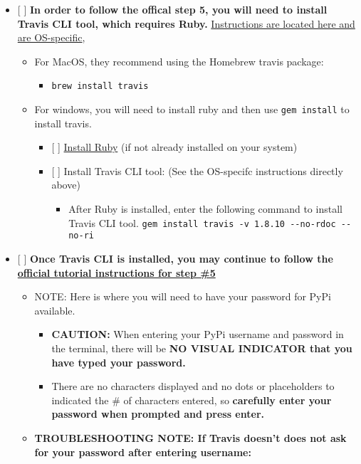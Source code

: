 \documentclass[11pt]{article}
\providecommand{\tightlist}{%
      \setlength{\itemsep}{0pt}\setlength{\parskip}{0pt}}
\begin{document}
\begin{itemize}
\tightlist
\item
  {[} {]} \textbf{In order to follow the offical step 5, you will need
  to install Travis CLI tool, which requires Ruby.}
  \href{https://cookiecutter-pypackage.readthedocs.io/en/latest/travis_pypi_setup.html\#travis-pypi-setup}{Instructions
  are located here and are OS-specific},

  \begin{itemize}
  \tightlist
  \item
    For MacOS, they recommend using the Homebrew travis package:

    \begin{itemize}
    \tightlist
    \item
      \texttt{brew\ install\ travis}
    \end{itemize}
  \item
    For windows, you will need to install ruby and then use
    \texttt{gem\ install} to install travis.

    \begin{itemize}
    \tightlist
    \item
      {[} {]} \href{http://www.ruby-lang.org/en/downloads/}{Install
      Ruby} (if not already installed on your system)
    \item
      {[} {]} Install Travis CLI tool: (See the OS-specifc instructions
      directly above)

      \begin{itemize}
      \tightlist
      \item
        After Ruby is installed, enter the following command to install
        Travis CLI tool.
        \texttt{gem\ install\ travis\ -v\ 1.8.10\ -\/-no-rdoc\ -\/-no-ri}
      \end{itemize}
    \end{itemize}
  \end{itemize}
\item
  {[} {]} \textbf{Once Travis CLI is installed, you may continue to
  follow the
  \href{https://cookiecutter-pypackage.readthedocs.io/en/latest/tutorial.html\#step-5-set-up-travis-ci}{official
  tutorial instructions for step \#5}}

  \begin{itemize}
  \tightlist
  \item
    NOTE: Here is where you will need to have your password for PyPi
    available.

    \begin{itemize}
    \tightlist
    \item
      \textbf{CAUTION:} When entering your PyPi username and password in
      the terminal, there will be \textbf{NO VISUAL INDICATOR that you
      have typed your password.} 
    \item
      There are no characters displayed and no dots or placeholders to
      indicated the \# of characters entered, so \textbf{carefully enter
      your password when prompted and press enter.}
    \end{itemize}
  \item
    \textbf{TROUBLESHOOTING NOTE: If Travis doesn't does not ask for
    your password after entering username:}


\end{itemize}
\end{itemize}
\end{document}
